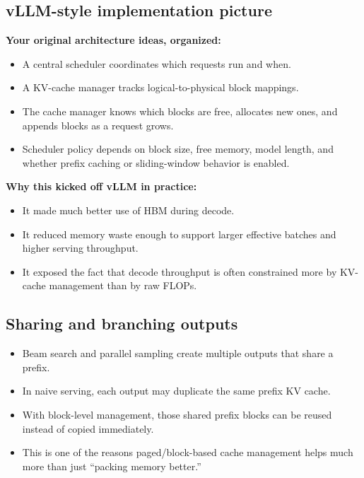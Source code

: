 \documentclass[11pt]{article}
\newcommand{\blue}[1]{\textcolor{myblue}{#1}}
\begin{document}
\subsection{vLLM-style implementation picture}
\textbf{Your original architecture ideas, organized:}
\begin{itemize}[leftmargin=1.2em]
\item A \blue{central scheduler} coordinates which requests run and when.
\item A \blue{KV-cache manager} tracks logical-to-physical block mappings.
\item The cache manager knows which blocks are free, allocates new ones, and appends blocks as a request grows.
\item Scheduler policy depends on block size, free memory, model length, and whether prefix caching or sliding-window behavior is enabled.
\end{itemize}

\textbf{Why this kicked off vLLM in practice:}
\begin{itemize}[leftmargin=1.2em]
\item It made much better use of HBM during decode.
\item It reduced memory waste enough to support larger effective batches and higher serving throughput.
\item It exposed the fact that decode throughput is often constrained more by KV-cache management than by raw FLOPs.
\end{itemize}

\subsection{Sharing and branching outputs}
\begin{itemize}[leftmargin=1.2em]
\item Beam search and parallel sampling create multiple outputs that share a prefix.
\item In naive serving, each output may duplicate the same prefix KV cache.
\item With block-level management, those shared prefix blocks can be reused instead of copied immediately.
\item This is one of the reasons paged/block-based cache management helps much more than just ``packing memory better.''
\end{itemize}
\end{document}
